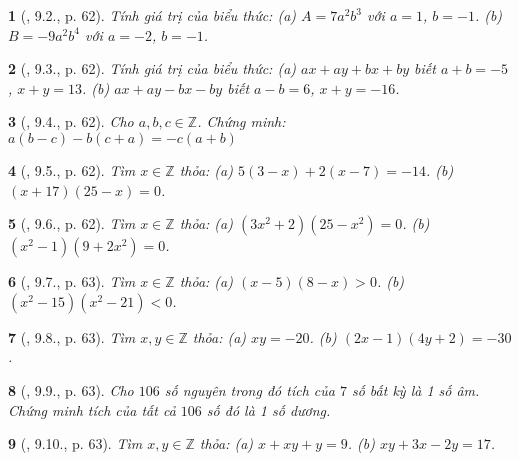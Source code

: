 \documentclass{article}
\newtheorem{baitoan}{}
\begin{document}
\begin{baitoan}[\cite{Binh_boi_duong_Toan_6_tap_1}, 9.2., p. 62]
	Tính giá trị của biểu thức: (a) $A = 7a^2b^3$ với $a = 1$, $b = -1$. (b) $B = -9a^2b^4$ với $a = -2$, $b = -1$.
\end{baitoan}

\begin{baitoan}[\cite{Binh_boi_duong_Toan_6_tap_1}, 9.3., p. 62]
	Tính giá trị của biểu thức: (a) $ax + ay + bx + by$ biết $a + b = -5$, $x + y = 13$. (b) $ax + ay - bx - by$ biết $a - b = 6$, $x + y = -16$.
\end{baitoan}

\begin{baitoan}[\cite{Binh_boi_duong_Toan_6_tap_1}, 9.4., p. 62]
	Cho $a,b,c\in\mathbb{Z}$. Chứng minh: $a(b - c) - b(c + a) = -c(a + b)$
\end{baitoan}

\begin{baitoan}[\cite{Binh_boi_duong_Toan_6_tap_1}, 9.5., p. 62]
	Tìm $x\in\mathbb{Z}$ thỏa: (a) $5(3 - x) + 2(x - 7) = -14$. (b) $(x + 17)(25 - x) = 0$.
\end{baitoan}

\begin{baitoan}[\cite{Binh_boi_duong_Toan_6_tap_1}, 9.6., p. 62]
	Tìm $x\in\mathbb{Z}$ thỏa: (a) $(3x^2 + 2)(25 - x^2) = 0$. (b) $(x^2 - 1)(9 + 2x^2) = 0$.
\end{baitoan}

\begin{baitoan}[\cite{Binh_boi_duong_Toan_6_tap_1}, 9.7., p. 63]
	Tìm $x\in\mathbb{Z}$ thỏa: (a) $(x - 5)(8 - x) > 0$. (b) $(x^2 - 15)(x^2 - 21) < 0$.
\end{baitoan}

\begin{baitoan}[\cite{Binh_boi_duong_Toan_6_tap_1}, 9.8., p. 63]
	Tìm $x,y\in\mathbb{Z}$ thỏa: (a) $xy = -20$. (b) $(2x - 1)(4y + 2) = -30$.
\end{baitoan}

\begin{baitoan}[\cite{Binh_boi_duong_Toan_6_tap_1}, 9.9., p. 63]
	Cho $106$ số nguyên trong đó tích của $7$ số bất kỳ là 1 số âm. Chứng minh tích của tất cả $106$ số đó là 1 số dương.
\end{baitoan}

\begin{baitoan}[\cite{Binh_boi_duong_Toan_6_tap_1}, 9.10., p. 63]
	Tìm $x,y\in\mathbb{Z}$ thỏa: (a) $x + xy + y = 9$. (b) $xy + 3x - 2y = 17$.
\end{baitoan}
\end{document}
